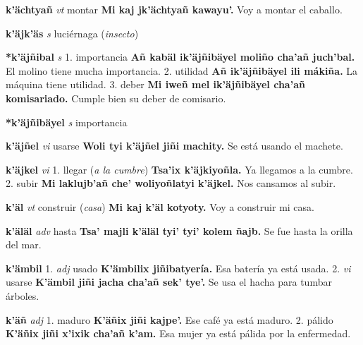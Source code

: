 \documentclass[10pt]{scrbook}
\newcommand{\entry}[1]{\textbf{#1}}
\newcommand{\onedefinition}[1]{#1.}
\newcommand{\partofspeech}[1]{\textit{#1}}
\newcommand{\spanishtranslation}[1]{#1}
\newcommand{\clarification}[1]{(\textit{#1})}
\newcommand{\cholexample}[1]{\textbf{#1}}
\newcommand{\exampletranslation}[1]{#1}
\begin{document}
\begin{multicols}{2}
\entry{k'ächtyañ}
\partofspeech{vt}
\spanishtranslation{montar}
\cholexample{Mi kaj jk'ächtyañ kawayu'.}
\exampletranslation{Voy a montar el caballo.}

\entry{k'äjk'äs}
\partofspeech{s}
\spanishtranslation{luciérnaga}
\clarification{insecto}

\entry{*k'äjñibal}
\partofspeech{s}
\onedefinition{1}
\spanishtranslation{importancia}
\cholexample{Añ kabäl ik'äjñibäyel moliño cha'añ juch'bal.}
\exampletranslation{El molino tiene mucha importancia.}
\onedefinition{2}
\spanishtranslation{utilidad}
\cholexample{Añ ik'äjñibäyel ili mákiña.}
\exampletranslation{La máquina tiene utilidad.}
\onedefinition{3}
\spanishtranslation{deber}
\cholexample{Mi iweñ mel ik'äjñibäyel cha'añ komisariado.}
\exampletranslation{Cumple bien su deber de comisario.}

\entry{*k'äjñibäyel}
\partofspeech{s}
\spanishtranslation{importancia}

\entry{k'äjñel}
\partofspeech{vi}
\spanishtranslation{usarse}
\cholexample{Woli tyi k'äjñel jiñi machity.}
\exampletranslation{Se está usando el machete.}

\entry{k'äjkel}
\partofspeech{vi}
\onedefinition{1}
\spanishtranslation{llegar}
\clarification{a la cumbre}
\cholexample{Tsa'ix k'äjkiyoñla.}
\exampletranslation{Ya llegamos a la cumbre.}
\onedefinition{2}
\spanishtranslation{subir}
\cholexample{Mi laklujb'añ che' woliyoñlatyi k'äjkel.}
\exampletranslation{Nos cansamos al subir.}

\entry{k'äl}
\partofspeech{vt}
\spanishtranslation{construir}
\clarification{casa}
\cholexample{Mi kaj k'äl kotyoty.}
\exampletranslation{Voy a construir mi casa.}

\entry{k'äläl}
\partofspeech{adv}
\spanishtranslation{hasta}
\cholexample{Tsa' majli k'äläl tyi' tyi' kolem ñajb.}
\exampletranslation{Se fue hasta la orilla del mar.}

\entry{k'ämbil}
\onedefinition{1}
\partofspeech{adj}
\spanishtranslation{usado}
\cholexample{K'ämbilix jiñibatyería.}
\exampletranslation{Esa batería ya está usada.}
\onedefinition{2}
\partofspeech{vi}
\spanishtranslation{usarse}
\cholexample{K'ämbil jiñi jacha cha'añ sek' tye'.}
\exampletranslation{Se usa el hacha para tumbar árboles.}

\entry{k'äñ}
\partofspeech{adj}
\onedefinition{1}
\spanishtranslation{maduro}
\cholexample{K'äñix jiñi kajpe'.}
\exampletranslation{Ese café ya está maduro.}
\onedefinition{2}
\spanishtranslation{pálido}
\cholexample{K'äñix jiñi x'ixik cha'añ k'am.}
\exampletranslation{Esa mujer ya está pálida por la enfermedad.}


\end{multicols}
\end{document}
